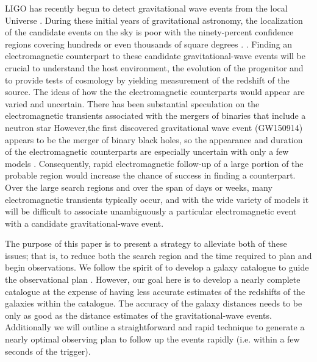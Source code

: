 \documentclass[useAMS,usenatbib]{mn2e}
\begin{document}
LIGO has recently begun to detect gravitational wave events from the
local Universe \citep{PhysRevLett.116.061102}.  During these initial
years of gravitational astronomy, the localization of the candidate
events on the sky is poor with the ninety-percent confidence regions
covering hundreds or even thousands of square degrees .
\citep{2014ApJ...789L...5K,2014ApJ...795..105S,2015ApJ...804..114B,2016LRR....19....1A}.
Finding an
electromagnetic counterpart to these candidate gravitational-wave
events will be crucial to understand the host environment, the
evolution of the progenitor and to provide tests of cosmology
by yielding measurement of the redshift of the source.  The
ideas of how the the electromagnetic counterparts would appear are
varied and uncertain. There has been substantial speculation on the
electromagnetic transients associated with the mergers of binaries
that include a neutron star
\citep[e.g.][]{2016PhRvD..93b4011E,2016arXiv160107711K,2016arXiv160100017D,
  2015arXiv151205435F,2015ApJ...814L..20M,2015PhRvD..92d4028K,
  2015arXiv150807939S,2015arXiv150807911S}
However,the first discovered gravitational wave event (GW150914)
appears to be the merger of binary black holes, so the appearance and
duration of the electromagnetic counterparts are especially uncertain
with only a few models
\citep[e.g.][]{2015PhRvL.115n1102G,2015MNRAS.452.3419M,2016MNRAS.457..939C,2016ApJ...817..183Y}.
Consequently, rapid electromagnetic follow-up of a large portion of
the probable region would increase the chance of success in finding a
counterpart.  Over the large search regions and over the span of days
or weeks, many electromagnetic transients typically occur, and with
the wide variety of models it will be difficult to associate
unambiguously a particular electromagnetic event with a candidate
gravitational-wave event.

The purpose of this paper is to present a strategy to alleviate both
of these issues; that is, to reduce both the search region and the
time required to plan and begin observations.  We follow the spirit of
\citet{2015arXiv150803608G} to develop a galaxy catalogue to guide the
observational plan \citep[see
  also][]{PhysRevD.82.102002,0004-637X-784-1-8,Ghosh2015,Fan2015,2015ApJ...801L...1B}.
However, our goal here is to develop a nearly complete catalogue at
the expense of having less accurate estimates of the redshifts of the
galaxies within the catalogue.  The accuracy of the galaxy distances
needs to be only as good as the distance estimates of the
gravitational-wave events.  Additionally we will outline a
straightforward and rapid technique to generate a nearly optimal
observing plan to follow up the events rapidly (i.e. within a few
seconds of the trigger).
\end{document}
